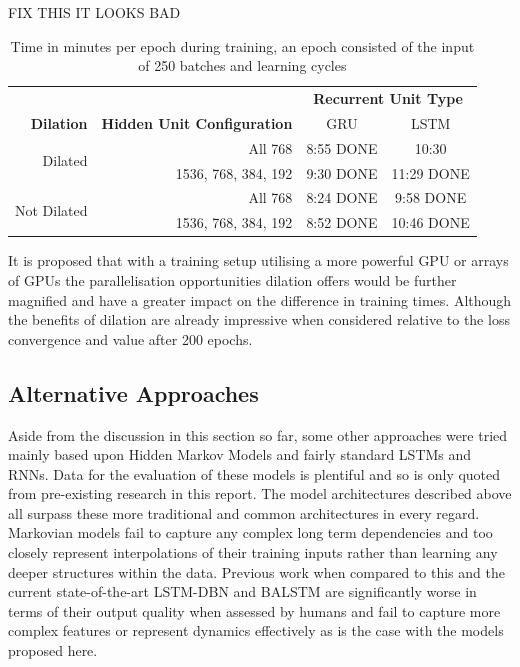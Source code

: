 \documentclass[12pt,]{article}
\begin{document}
FIX THIS IT LOOKS BAD

\setlength\extrarowheight{1pt}
\begin{table}[H]
\centering
\caption{Time in minutes per epoch during training, an epoch consisted of the input of 250 batches and learning cycles}
\begin{tabular}{rr|cc} 
\toprule
                             &                                    & \multicolumn{2}{c}{\textbf{Recurrent Unit Type}}  \\
\textbf{Dilation}            & \textbf{Hidden Unit Configuration} & GRU   & LSTM                                      \\ 
\hline\hline
\multirow{2}{*}{Dilated}     & All 768                            & 8:55 DONE  & 10:30                                     \\ 
\cline{2-2}
                             & 1536, 768, 384, 192                & 9:30 DONE  & 11:29 DONE                                     \\ 
\cline{1-2}
\multirow{2}{*}{Not Dilated} & All 768                            & 8:24 DONE  & 9:58 DONE                           \\ 
\cline{2-2}
                             & 1536, 768, 384, 192                & 8:52 DONE & 10:46 DONE                                     \\
\bottomrule
\end{tabular}
\end{table}

It is proposed that with a training setup utilising a more powerful GPU
or arrays of GPUs the parallelisation opportunities dilation offers
would be further magnified and have a greater impact on the difference
in training times. Although the benefits of dilation are already
impressive when considered relative to the loss convergence and value
after 200 epochs.

\hypertarget{alternative-approaches}{%
\subsection{Alternative Approaches}\label{alternative-approaches}}

Aside from the discussion in this section so far, some other approaches
were tried mainly based upon Hidden Markov Models and fairly standard
LSTMs and RNNs. Data for the evaluation of these models is plentiful and
so is only quoted from pre-existing research in this report. The model
architectures described above all surpass these more traditional and
common architectures in every regard. Markovian models fail to capture
any complex long term dependencies and too closely represent
interpolations of their training inputs rather than learning any deeper
structures within the data. Previous work when compared to this and the
current state-of-the-art LSTM-DBN and BALSTM are significantly worse in
terms of their output quality when assessed by humans and fail to
capture more complex features or represent dynamics effectively as is
the case with the models proposed here.
\end{document}
